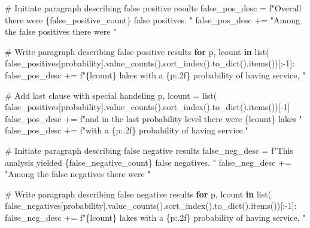 \documentclass[
]{article}
\newenvironment{Shaded}{\begin{snugshade}}{\end{snugshade}}
\newcommand{\BuiltInTok}[1]{\textcolor[rgb]{0.00,0.23,0.31}{#1}}
\newcommand{\CommentTok}[1]{\textcolor[rgb]{0.37,0.37,0.37}{#1}}
\newcommand{\ControlFlowTok}[1]{\textcolor[rgb]{0.00,0.23,0.31}{\textbf{#1}}}
\newcommand{\DecValTok}[1]{\textcolor[rgb]{0.68,0.00,0.00}{#1}}
\newcommand{\KeywordTok}[1]{\textcolor[rgb]{0.00,0.23,0.31}{\textbf{#1}}}
\newcommand{\NormalTok}[1]{\textcolor[rgb]{0.00,0.23,0.31}{#1}}
\newcommand{\OperatorTok}[1]{\textcolor[rgb]{0.37,0.37,0.37}{#1}}
\newcommand{\SpecialCharTok}[1]{\textcolor[rgb]{0.37,0.37,0.37}{#1}}
\newcommand{\SpecialStringTok}[1]{\textcolor[rgb]{0.13,0.47,0.30}{#1}}
\newcommand{\StringTok}[1]{\textcolor[rgb]{0.13,0.47,0.30}{#1}}
\begin{document}
\begin{Shaded}
\begin{Highlighting}[]
\CommentTok{\# Initiate paragraph describing false positive results}
\NormalTok{false\_pos\_desc }\OperatorTok{=} \SpecialStringTok{f"Overall there were }\SpecialCharTok{\{}\NormalTok{false\_positive\_count}\SpecialCharTok{\}}\SpecialStringTok{ false positives. "}
\NormalTok{false\_pos\_desc }\OperatorTok{+=} \StringTok{"Among the false positives there were "}

\CommentTok{\# Write paragraph describing false positive results}
\ControlFlowTok{for}\NormalTok{ p, lcount }\KeywordTok{in} \BuiltInTok{list}\NormalTok{(}
\NormalTok{    false\_positives[}\StringTok{\textquotesingle{}probability\textquotesingle{}}\NormalTok{].value\_counts().sort\_index().to\_dict().items())[:}\OperatorTok{{-}}\DecValTok{1}\NormalTok{]:}
\NormalTok{    false\_pos\_desc }\OperatorTok{+=} \SpecialStringTok{f"}\SpecialCharTok{\{}\NormalTok{lcount}\SpecialCharTok{\}}\SpecialStringTok{ lakes with a }\SpecialCharTok{\{}\NormalTok{p}\SpecialCharTok{:.2f\}}\SpecialStringTok{ probability of having service, "}

\CommentTok{\# Add last clause with special handeling}
\NormalTok{p, lcount }\OperatorTok{=} \BuiltInTok{list}\NormalTok{(}
\NormalTok{    false\_positives[}\StringTok{\textquotesingle{}probability\textquotesingle{}}\NormalTok{].value\_counts().sort\_index().to\_dict().items())[}\OperatorTok{{-}}\DecValTok{1}\NormalTok{]}
\NormalTok{false\_pos\_desc }\OperatorTok{+=} \SpecialStringTok{f"and in the last probability level there were }\SpecialCharTok{\{}\NormalTok{lcount}\SpecialCharTok{\}}\SpecialStringTok{ lakes "}
\NormalTok{false\_pos\_desc }\OperatorTok{+=} \SpecialStringTok{f"with a }\SpecialCharTok{\{}\NormalTok{p}\SpecialCharTok{:.2f\}}\SpecialStringTok{ probability of having service."}

\CommentTok{\# Initiate paragraph describing false negative results}
\NormalTok{false\_neg\_desc }\OperatorTok{=} \SpecialStringTok{f"This analysis yielded }\SpecialCharTok{\{}\NormalTok{false\_negative\_count}\SpecialCharTok{\}}\SpecialStringTok{ false negatives. "}
\NormalTok{false\_neg\_desc }\OperatorTok{+=} \StringTok{"Among the false negatives there were "}

\CommentTok{\# Write paragraph describing false negative results}
\ControlFlowTok{for}\NormalTok{ p, lcount }\KeywordTok{in} \BuiltInTok{list}\NormalTok{(}
\NormalTok{    false\_negatives[}\StringTok{\textquotesingle{}probability\textquotesingle{}}\NormalTok{].value\_counts().sort\_index().to\_dict().items())[:}\OperatorTok{{-}}\DecValTok{1}\NormalTok{]:}
\NormalTok{    false\_neg\_desc }\OperatorTok{+=} \SpecialStringTok{f"}\SpecialCharTok{\{}\NormalTok{lcount}\SpecialCharTok{\}}\SpecialStringTok{ lakes with a }\SpecialCharTok{\{}\NormalTok{p}\SpecialCharTok{:.2f\}}\SpecialStringTok{ probability of having service, "}


\end{Highlighting}
\end{Shaded}
\end{document}
